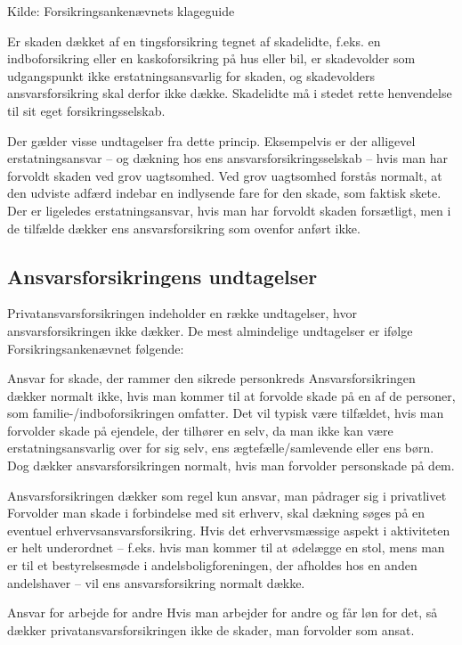 \documentclass[]{book}
\begin{document}
Kilde: Forsikringsankenævnets klageguide

Er skaden dækket af en tingsforsikring tegnet af skadelidte, f.eks. en indboforsikring eller en kaskoforsikring på hus eller bil, er skadevolder som udgangspunkt ikke erstatningsansvarlig for skaden, og skadevolders ansvarsforsikring skal derfor ikke dække. Skadelidte må i stedet rette henvendelse til sit eget forsikringsselskab.

Der gælder visse undtagelser fra dette princip. Eksempelvis er der alligevel erstatningsansvar -- og dækning hos ens ansvarsforsikringsselskab -- hvis man har forvoldt skaden ved grov uagtsomhed. Ved grov uagtsomhed forstås normalt, at den udviste adfærd indebar en indlysende fare for den skade, som faktisk skete. Der er ligeledes erstatningsansvar, hvis man har forvoldt skaden forsætligt, men i de tilfælde dækker ens ansvarsforsikring som ovenfor anført ikke.

\hypertarget{ansvarsforsikringens-undtagelser}{%
\subsection{Ansvarsforsikringens undtagelser}\label{ansvarsforsikringens-undtagelser}}

Privatansvarsforsikringen indeholder en række undtagelser, hvor ansvarsforsikringen ikke dækker. De mest almindelige undtagelser er ifølge Forsikringsankenævnet følgende:

Ansvar for skade, der rammer den sikrede personkreds
Ansvarsforsikringen dækker normalt ikke, hvis man kommer til at forvolde skade på en af de personer, som familie-/indboforsikringen omfatter. Det vil typisk være tilfældet, hvis man forvolder skade på ejendele, der tilhører en selv, da man ikke kan være erstatningsansvarlig over for sig selv, ens ægtefælle/samlevende eller ens børn. Dog dækker ansvarsforsikringen normalt, hvis man forvolder personskade på dem.

Ansvarsforsikringen dækker som regel kun ansvar, man pådrager sig i privatlivet
Forvolder man skade i forbindelse med sit erhverv, skal dækning søges på en eventuel erhvervsansvarsforsikring. Hvis det erhvervsmæssige aspekt i aktiviteten er helt underordnet -- f.eks. hvis man kommer til at ødelægge en stol, mens man er til et bestyrelsesmøde i andelsboligforeningen, der afholdes hos en anden andelshaver -- vil ens ansvarsforsikring normalt dække.

Ansvar for arbejde for andre
Hvis man arbejder for andre og får løn for det, så dækker privatansvarsforsikringen ikke de skader, man forvolder som ansat.
\end{document}
